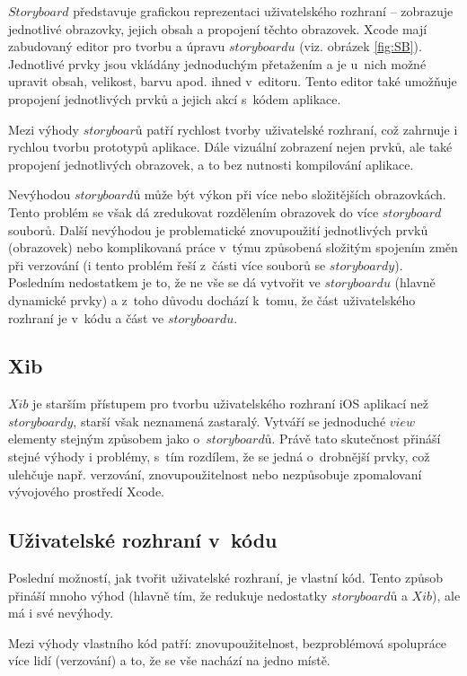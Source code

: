 \documentclass[thesis=M,czech]{FITthesis}[2012/06/26]
\begin{document}
$Storyboard$ představuje grafickou reprezentaci uživatelského rozhraní -- zobrazuje jednotlivé obrazovky, jejich obsah a propojení těchto obrazovek. Xcode mají zabudovaný editor pro tvorbu a úpravu $storyboardu$ (viz. obrázek \ref{fig:SB}). Jednotlivé prvky jsou vkládány jednoduchým přetažením a je u~nich možné upravit obsah, velikost, barvu apod. ihned v~editoru. Tento editor také umožňuje propojení jednotlivých prvků a jejich akcí s~kódem aplikace. \cite{SB}

Mezi výhody $storyboarů$ patří rychlost tvorby uživatelské rozhraní, což zahrnuje i rychlou tvorbu prototypů aplikace. Dále vizuální zobrazení nejen prvků, ale také propojení jednotlivých obrazovek, a to bez nutnosti kompilování aplikace. 

Nevýhodou $storyboardů$ může být výkon při více nebo složitějších obrazovkách. Tento problém se však dá zredukovat rozdělením obrazovek do více $storyboard$ souborů. Další nevýhodou je problematické znovupoužití jednotlivých prvků (obrazovek) nebo komplikovaná práce v~týmu způsobená složitým spojením změn při verzování (i tento problém řeší z~části více souborů se $storyboardy$). Posledním nedostatkem je to, že ne vše se dá vytvořit ve $storyboardu$ (hlavně dynamické prvky) a z~toho důvodu dochází k~tomu, že část uživatelského rozhraní je v~kódu a část ve $storyboardu$. \cite{iOSUI} \cite{dominik}

\subsection{Xib}
$Xib$ je starším přístupem pro tvorbu uživatelského rozhraní iOS aplikací než $storyboardy$, starší však neznamená zastaralý. Vytváří se jednoduché $view$ elementy stejným způsobem jako o~$storyboardů$. Právě tato skutečnost přináší stejné výhody i problémy, s~tím rozdílem, že se jedná o~drobnější prvky, což ulehčuje např. verzování, znovupoužitelnost nebo nezpůsobuje zpomalovaní vývojového prostředí Xcode. \cite{iOSUI} \cite{dominik}

\subsection{Uživatelské rozhraní v~kódu}
Poslední možností, jak tvořit uživatelské rozhraní, je vlastní kód. Tento způsob přináší mnoho výhod (hlavně tím, že redukuje nedostatky $storyboardů$ a $Xib$), ale má i své nevýhody.

Mezi výhody vlastního kód patří: znovupoužitelnost, bezproblémová spolupráce více lidí (verzování) a to, že se vše nachází na jedno místě. 
\end{document}
